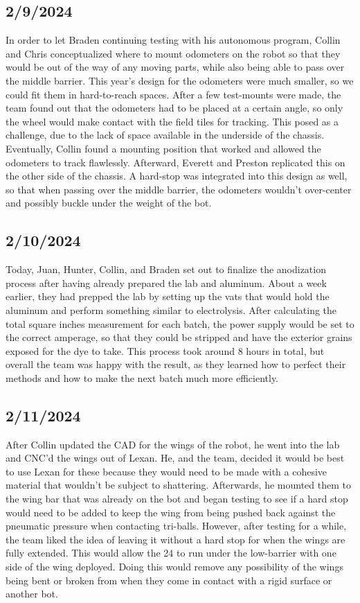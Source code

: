  \subsection{2/9/2024}
 In order to let Braden continuing testing with his autonomous program, Collin and Chris conceptualized where to mount odometers on the robot so that they would be out of the way of any moving parts, while also being able to pass over the middle barrier. 
 This year's design for the odometers were much smaller, so we could fit them in hard-to-reach spaces. After a few test-mounts were made, the team found out that the odometers had to be placed at a certain angle, so only the wheel would make contact with the field tiles for tracking. 
 This posed as a challenge, due to the lack of space available in the underside of the chassis. Eventually, Collin found a mounting position that worked and allowed the odometers to track flawlessly. Afterward, Everett and Preston replicated this on the other side of the chassis. A hard-stop was integrated into this design as well, so that
  when passing over the middle barrier, the odometers wouldn't over-center and possibly buckle under the weight of the bot.
 \subsection{2/10/2024}
 Today, Juan, Hunter, Collin, and Braden set out to finalize the anodization process after having already prepared the lab and aluminum. 
 About a week earlier, they had prepped the lab by setting up the vats that would hold the aluminum and perform something similar to electrolysis. After calculating the 
 total square inches measurement for each batch, the power supply would be set to the correct amperage, so that they could be stripped and have the exterior grains exposed for the dye to take. This process 
 took around 8 hours in total, but overall the team was happy with the result, as they learned how to perfect their methods and how to make the next batch much more efficiently. 
 \subsection{2/11/2024}
 After Collin updated the CAD for the wings of the robot, he went into the lab and CNC'd the wings out of Lexan. 
 He, and the team, decided it would be best to use Lexan for these because they would need to be made with a cohesive material that wouldn't be subject to shattering.
 Afterwards, he mounted them to the wing bar that was already on the bot and began testing to see if a hard stop would need to be added to keep the wing from being pushed back against the pneumatic pressure when 
  contacting tri-balls. However, after testing for a while, the team liked the idea of leaving it without a hard stop for when the wings are fully extended. This would allow the 24
   to run under the low-barrier with one side of the wing deployed. Doing this would remove any possibility of the wings being bent or broken from when they come in contact with a rigid surface or another bot.
